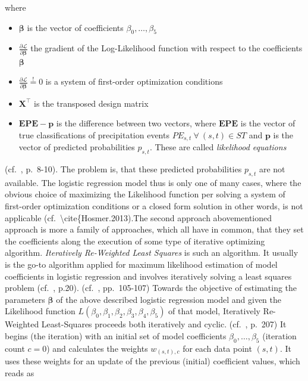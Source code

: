 \documentclass[
  12pt,
]{article}
\begin{document}
where

\begin{itemize}[label={}]
\item $\boldsymbol{\beta}$ is the vector of coefficients $\beta_0,\dots,\beta_5$
\item $\frac{\partial\mathcal{L}}{\partial\boldsymbol{\beta}}$ the gradient of the Log-Likelihood function with respect to the coefficients $\boldsymbol{\beta}$ 
\item $\frac{\partial\mathcal{L}}{\partial\boldsymbol{\beta}}\stackrel{!}{=}0$ is a system of first-order optimization conditions 
\item $\mathbf{X}^\top$ is the transposed design matrix 
\item $\mathbf{EPE} - \mathbf{p}$ is the difference between two vectors, where $\mathbf{EPE}$ is the vector of true classifications of precipitation events $PE_{s,t}\:\forall\:(s,t)\in ST$ and $\mathbf{p}$ is the vector of predicted probabilities $p_{s,t}$. These are called \textit{likelihood equations}
\end{itemize}

(cf.~\cite{Hosmer.2013}, p.~8-10). The problem is, that these predicted
probabilities \(p_{s,t}\) are not available. The logistic regression
model thus is only one of many cases, where the obvious choice of
maximizing the Likelihood function per solving a system of first-order
optimization conditions or a closed form solution in other words, is not
applicable (cf.~\textbackslash cite\{Hosmer.2013).\newline The second
approach abovementioned approach is more a family of approaches, which
all have in common, that they set the coefficients along the execution
of some type of iterative optimizing algorithm.
\textit{Iteratively Re-Weighted Least Squares} is such an algorithm. It
usually is the go-to algorithm applied for maximum likelihood estimation
of model coefficients in logistic regression and involves iteratively
solving a least squares problem (cf.~\cite{Hosmer.2013}, p.20).
(cf.~\cite{Wood.2017}, pp.~105-107) Towards the objective of estimating
the parameters \(\boldsymbol{\beta}\) of the above described logistic
regression model and given the Likelihood function
\(L(\beta_0, \beta_1, \beta_2, \beta_3, \beta_4, \beta_5)\) of that
model, Iteratively Re-Weighted Least-Squares proceeds both iteratively
and cyclic. (cf.~\cite{Wood.2017}, p.~207) It begins (the iteration)
with an initial set of model coefficients \(\beta_0,\dots,\beta_5\)
(iteration count \(c=0\)) and calculates the weights \(w_{(s,t),c}\) for
each data point \((s,t)\). It uses these weights for an update of the
previous (initial) coefficient values, which reads as
\end{document}
